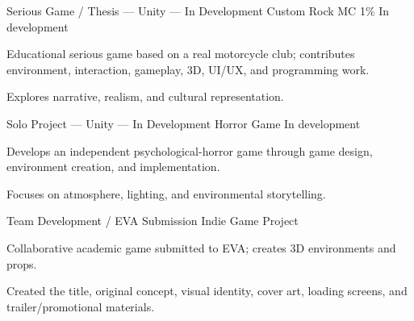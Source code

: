 \documentclass[10pt,a4paper]{../Awesome-CV/awesome-cv}
\begin{document}
\begin{cventries}
  \cventry
    {Serious Game / Thesis --- Unity --- In Development}
    {Custom Rock MC 1\%}
    {}
    {In development}
    {
      \begin{cvitems}
        \item {Educational serious game based on a real motorcycle club; contributes environment, interaction, gameplay, 3D, UI/UX, and programming work.}
        \item {Explores narrative, realism, and cultural representation.}
      \end{cvitems}
    }
  \cventry
    {Solo Project --- Unity --- In Development}
    {Horror Game}
    {}
    {In development}
    {
      \begin{cvitems}
        \item {Develops an independent psychological-horror game through game design, environment creation, and implementation.}
        \item {Focuses on atmosphere, lighting, and environmental storytelling.}
      \end{cvitems}
    }
  \cventry
    {Team Development / EVA Submission}
    {Indie Game Project}
    {}
    {}
    {
      \begin{cvitems}
        \item {Collaborative academic game submitted to EVA; creates 3D environments and props.}
        \item {Created the title, original concept, visual identity, cover art, loading screens, and trailer/promotional materials.}
      \end{cvitems}
    }
\end{cventries}


\end{document}
